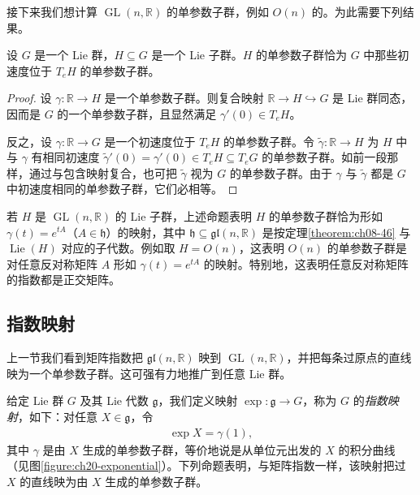 \documentclass[../../main.tex]{subfiles}
\begin{document}
接下来我们想计算 $\operatorname{GL}(n,\mathbb{R})$ 的单参数子群，例如 $O(n)$ 的。为此需要下列结果。

\begin{proposition}\label{proposition:ch20-子群单参数}
设 $G$ 是一个 Lie 群，$H\subseteq G$ 是一个 Lie 子群。$H$ 的单参数子群恰为 $G$ 中那些初速度位于 $T_eH$ 的单参数子群。
\end{proposition}

\begin{proof}
设 $\gamma\colon\mathbb{R}\to H$ 是一个单参数子群。则复合映射 $\mathbb{R}\to H\hookrightarrow G$ 是 Lie 群同态，因而是 $G$ 的一个单参数子群，且显然满足 $\gamma'(0)\in T_eH$。

反之，设 $\gamma\colon\mathbb{R}\to G$ 是一个初速度位于 $T_eH$ 的单参数子群。令 $\widetilde\gamma\colon\mathbb{R}\to H$ 为 $H$ 中与 $\gamma$ 有相同初速度 $\widetilde\gamma'(0)=\gamma'(0)\in T_eH\subseteq T_eG$ 的单参数子群。如前一段那样，通过与包含映射复合，也可把 $\widetilde\gamma$ 视为 $G$ 的单参数子群。由于 $\gamma$ 与 $\widetilde\gamma$ 都是 $G$ 中初速度相同的单参数子群，它们必相等。
\end{proof}

\begin{example}\label{example:ch20-正交群单参数}
若 $H$ 是 $\operatorname{GL}(n,\mathbb{R})$ 的 Lie 子群，上述命题表明 $H$ 的单参数子群恰为形如 $\gamma(t)=e^{tA}$（$A\in\mathfrak h$）的映射，其中 $\mathfrak h\subseteq\mathfrak{gl}(n,\mathbb{R})$ 是按定理\cref{theorem:ch08-46} 与 $\operatorname{Lie}(H)$ 对应的子代数。例如取 $H=O(n)$，这表明 $O(n)$ 的单参数子群是对任意反对称矩阵 $A$ 形如 $\gamma(t)=e^{tA}$ 的映射。特别地，这表明任意反对称矩阵的指数都是正交矩阵。
\end{example}

\subsection{指数映射}

上一节我们看到矩阵指数把 $\mathfrak{gl}(n,\mathbb{R})$ 映到 $\operatorname{GL}(n,\mathbb{R})$，并把每条过原点的直线映为一个单参数子群。这可强有力地推广到任意 Lie 群。

给定 Lie 群 $G$ 及其 Lie 代数 $\mathfrak g$，我们定义映射 $\exp\colon\mathfrak g\to G$，称为 $G$ 的\emph{指数映射}，如下：对任意 $X\in\mathfrak g$，令
\begin{align*}
\exp X=\gamma(1),
\end{align*}
其中 $\gamma$ 是由 $X$ 生成的单参数子群，等价地说是从单位元出发的 $X$ 的积分曲线（见图\cref{figure:ch20-exponential}）。下列命题表明，与矩阵指数一样，该映射把过 $X$ 的直线映为由 $X$ 生成的单参数子群。
\end{document}
